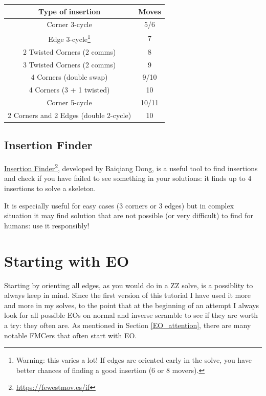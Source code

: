 \documentclass[11pt,a4paper]{book}
\begin{document}
\begin{center}
\begin{tabular}{|c|c|}
\hline
\textbf{Type of insertion} & \textbf{Moves}\\
\hline
Corner 3-cycle & 5/6\\
\hline
Edge 3-cycle\footnote{Warning: this varies a lot! If edges are oriented early in the solve, you have better chances of finding a good insertion (6 or 8 movers).} & 7\\
\hline
2 Twisted Corners (2 comms) & 8\\
\hline
3 Twisted Corners (2 comms) & 9\\
\hline
4 Corners (double swap) & 9/10\\
\hline
4 Corners (3 + 1 twisted) & 10\\
\hline
Corner 5-cycle & 10/11\\
\hline
2 Corners and 2 Edges (double 2-cycle) & 10\\
\hline
\end{tabular}
\end{center}

\subsection{Insertion Finder}

\href{https://fewestmov.es/if}{Insertion Finder}\footnote{\url{https://fewestmov.es/if}}, developed by Baiqiang Dong, is a useful tool to find insertions and check if you have failed to see something in your solutions: it finds up to 4 insertions to solve a skeleton.

It is especially useful for easy cases (3 corners or 3 edges) but in complex situation it may find solution that are not possible (or very difficult) to find for humans: use it responsibly!

\section{Starting with EO}
\label{eo}

Starting by orienting all edges, as you would do in a ZZ solve, is a possiblity to always keep in mind. Since the first version of this tutorial I have used it more and more in my solves, to the point that at the beginning of an attempt I always look for all possible EOs on normal and inverse scramble to see if they are worth a try: they often are. As mentioned in Section \ref{EO_attention}, there are many notable FMCers that often start with EO.
\end{document}
